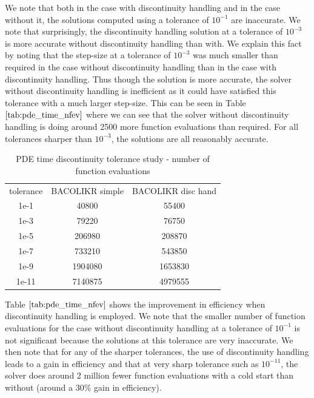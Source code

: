 \documentclass{article}
\begin{document}
We note that both in the case with discontinuity handling and in the case without it, the solutions computed using a tolerance of $10^{-1}$ are inaccurate. We note that surprisingly, the discontinuity handling solution at a tolerance of $10^{-3}$ is more accurate without discontinuity handling than with. We explain this fact by noting that the step-size at a tolerance of $10^{-3}$ was much smaller than required in the case without discontinuity handling than in the case with discontinuity handling. Thus though the solution is more accurate, the solver without discontinuity handling is inefficient as it could have satisfied this tolerance with a much larger step-size. This can be seen in Table $\ref{tab:pde_time_nfev}$ where we can see that the solver without discontinuity handling is doing around 2500 more function evaluations than required. For all tolerances sharper than $10^{-3}$, the solutions are all reasonably accurate.

\begin{table}[h]
\caption {PDE time discontinuity tolerance study - number of function evaluations} 
\label{tab:pde_time_nfev}
\begin{center}
\begin{tabular}{ c c c } 
tolerance & BACOLIKR simple  & BACOLIKR disc hand \\ 
1e-1      &   40800         &   55400 \\
1e-3      &   79220         &   76750 \\
1e-5      &  206980         &  208870 \\
1e-7      &  733210         &  543850 \\
1e-9      & 1904080         & 1653830 \\
1e-11     & 7140875         & 4979555 \\
\end{tabular}
\end{center}
\end{table}

Table $\ref{tab:pde_time_nfev}$ shows the improvement in efficiency when discontinuity handling is employed. We note that the smaller number of function evaluations for the case without discontinuity handling at a tolerance of $10^{-1}$ is not significant because the solutions at this tolerance are very inaccurate. We then note that for any of the sharper tolerances, the use of discontinuity handling leads to a gain in efficiency and that at very sharp tolerance such as $10^{-11}$, the solver does around 2 million fewer function evaluations with a cold start than without (around a $30\%$ gain in efficiency). 
\end{document}
